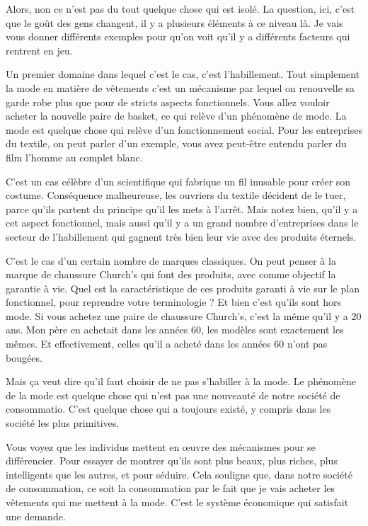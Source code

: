 \begin{small}
Alors, non ce n'est pas du tout quelque chose qui est isolé. La question, ici, c'est que le goût des gens changent, il y a plusieurs éléments à ce niveau là. Je vais vous donner différents exemples pour qu'on voit qu'il y a différents facteurs qui rentrent en jeu. 

Un premier domaine dans lequel c'est le cas, c'est l'habillement. Tout simplement la mode en matière de vêtements c'est un mécanisme par lequel on renouvelle sa garde robe plus que pour de stricts aspects fonctionnels.  Vous allez vouloir acheter la nouvelle paire de basket, ce qui relève d'un phénomène de mode. La mode est quelque chose qui relève d'un fonctionnement social. Pour les entreprises du textile, on peut parler d'un exemple, vous avez peut-être entendu parler du film l'homme au complet blanc. 


C'est un cas célèbre d'un scientifique  qui fabrique un fil inusable pour créer son costume. Conséquence malheureuse, les ouvriers du textile décident de le tuer, parce qu'ils partent du principe qu'il les mets à l’arrêt. 
\smallbreak
Mais notez bien, qu'il y a cet aspect fonctionnel, mais aussi qu'il y a un grand nombre d'entreprises dans le secteur de l'habillement qui gagnent très  bien leur vie avec des produits éternels. 

C'est le cas d'un certain nombre de marques classiques. On peut penser à la marque de chaussure Church's qui font des produits, avec comme objectif la garantie à vie. Quel est la caractéristique de ces produits garanti à vie sur le plan fonctionnel, pour reprendre votre terminologie ?  Et bien c'est qu'ils sont hors mode. Si vous achetez une paire de chaussure Church's, c'est la même qu'il y a 20 ans. Mon père en achetait dans les années 60, les modèles sont exactement les mêmes. Et effectivement, celles qu'il a acheté dans les années 60 n'ont pas bougées. 

Mais ça veut dire qu'il faut choisir de ne pas s'habiller à la mode. Le phénomène de la mode est quelque chose qui n'est pas une nouveauté de notre société de consommatio. C'est quelque chose qui a toujours existé, y compris dans les société les plus primitives. 

Vous voyez que les individus mettent en œuvre des mécanismes pour se différencier. Pour essayer de montrer qu'ils sont plus beaux, plus riches, plus intelligents que les autres, et pour séduire. Cela souligne que, dans notre société de consommation, ce soit la consommation par le fait que je vais acheter les vêtements qui me mettent à la mode. C'est le système économique qui satisfait une demande. 


\end{small}
